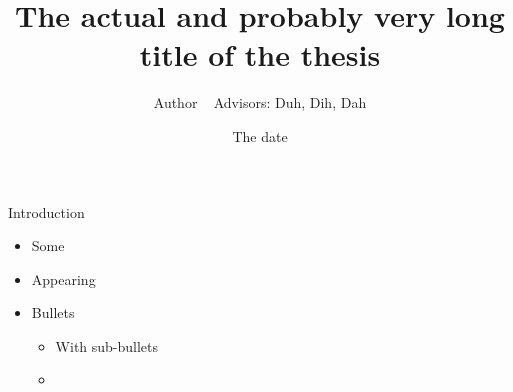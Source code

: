 \documentclass{thesisbeamer}
\title[Short title in footline]{The actual and probably very long title of the thesis}
\author[Name in footline]{Author \newline ~ \newline \normalsize{Advisors: Duh, Dih, Dah}}
\date{The date}
\begin{document}
\MakeTitleNoFoot

\begin{frame}{Introduction}
\begin{itemize}[<+->]
\item Some
\item Appearing
\item Bullets
\begin{itemize}
 \item With sub-bullets
 \item {}
\end{itemize}



\end{itemize}
\end{frame}
\end{document}
